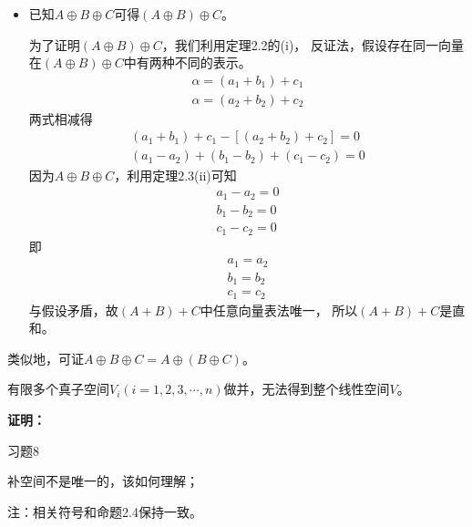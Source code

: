 \documentclass{article}
\begin{document}
\begin{itemize}
\begin{itemize}
          \item 方法二
                \begin{align*}
                  dim ((A \oplus B) \oplus C)
                   & = dim (A \oplus B) + dim C \\
                   & = dim A + dim B + dim C
                \end{align*}
                所以，$A \oplus B \oplus C$。
        \end{itemize}

  \item 已知$A \oplus B \oplus C$可得$(A \oplus B) \oplus C$。

        为了证明$(A \oplus B) \oplus C$，我们利用定理2.2的(i)，
        反证法，假设存在同一向量在$(A \oplus B) \oplus C$中有两种不同的表示。
        \begin{align*}
          \alpha = (a_1 + b_1) + c_1 \\
          \alpha = (a_2 + b_2) + c_2
        \end{align*}
        两式相减得
        \begin{align*}
          (a_1 + b_1) + c_1 - [(a_2 + b_2) + c_2] = 0 \\
          (a_1 - a_2) + (b_1 - b_2) + (c_1 - c_2) = 0
        \end{align*}
        因为$A \oplus B \oplus C$，利用定理2.3(ii)可知
        \begin{align*}
          a_1 - a_2 = 0 \\
          b_1 - b_2 = 0 \\
          c_1 - c_2 = 0
        \end{align*}
        即
        \begin{align*}
          a_1 = a_2 \\
          b_1 = b_2 \\
          c_1 = c_2
        \end{align*}
        与假设矛盾，故$(A + B) + C$中任意向量表法唯一，
        所以$(A + B) + C$是直和。
\end{itemize}
类似地，可证$A \oplus B \oplus C = A \oplus (B \oplus C)$。

\begin{zremark}
  有限多个真子空间$V_i (i = 1, 2, 3, \cdots, n)$做并，无法得到整个线性空间$V$。
\end{zremark}

\textbf{证明：}

习题8

\begin{zremark}
  补空间不是唯一的，该如何理解；
\end{zremark}
注：相关符号和命题2.4保持一致。
\end{document}
